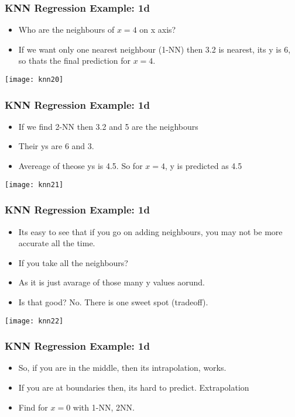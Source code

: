 \begin{frame}[fragile]\frametitle{KNN Regression Example: 1d}
\begin{itemize}
\item Who are the neighbours of $x=4$ on x axis?
\item If we want only one nearest neighbour (1-NN) then 3.2 is nearest, its y is 6, so thats the final prediction for $x=4$.
\end{itemize}
\begin{center}
\texttt{[image: knn20]}
\end{center}
\end{frame}


\begin{frame}[fragile]\frametitle{KNN Regression Example: 1d}
\begin{itemize}
\item If we find 2-NN then 3.2 and 5 are the neighbours
\item Their ys are 6 and 3.
\item Avereage of theose ys is 4.5. So for $x=4$, y is predicted as 4.5
\end{itemize}
\begin{center}
\texttt{[image: knn21]}
\end{center}
\end{frame}


\begin{frame}[fragile]\frametitle{KNN Regression Example: 1d}
\begin{itemize}
\item Its easy to see that if you go on adding neighbours, you may not be more accurate all the time.
\item If you take all the neighbours?
\item As it is just avarage of those many y values aorund.
\item Is that good? No. There is one sweet spot (tradeoff).
\end{itemize}
\begin{center}
\texttt{[image: knn22]}
\end{center}
\end{frame}


\begin{frame}[fragile]\frametitle{KNN Regression Example: 1d}
\begin{itemize}
\item So, if you are in the middle, then  its intrapolation, works.
\item If you are at boundaries then, its hard to predict. Extrapolation
\item Find for $x=0$ with 1-NN, 2NN.
\end{itemize}
\end{frame}


